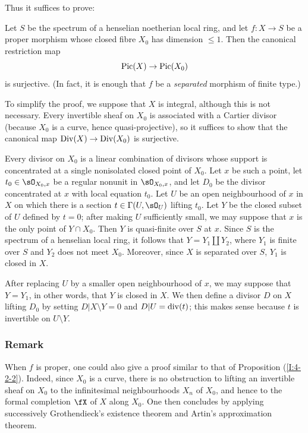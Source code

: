 Thus it suffices to prove:

\begin{proposition}\label{I:4-4-1}
Let $S$ be the spectrum of a henselian noetherian local ring, and let
$f:X\to S$ be a proper morphism whose closed fibre $X_0$ has dimension
$\leqslant1$. Then the canonical restriction map
\[
  \operatorname{Pic}(X)\to \operatorname{Pic}(X_0)
\]
is surjective. (In fact, it is enough that $f$ be a \emph{separated}
morphism of finite type.)
\end{proposition}

To simplify the proof, we suppose that $X$ is integral, although this is
not necessary. Every invertible sheaf on $X_0$ is associated with a
Cartier divisor (because $X_0$ is a curve, hence quasi-projective), so it
suffices to show that the canonical map $\operatorname{Div}(X)\to\operatorname{Div}(X_0)$ is
surjective.

Every divisor on $X_0$ is a linear combination of divisors whose support
is concentrated at a single nonisolated closed point of $X_0$. Let $x$
be such a point, let $t_0\in\sO_{X_0,x}$ be a regular nonunit in
$\sO_{X_0,x}$, and let $D_0$ be the divisor concentrated at $x$ with
local equation $t_0$. Let $U$ be an open neighbourhood of $x$ in $X$
on which there is a section $t\in\Gamma(U,\sO_U)$ lifting $t_0$. Let
$Y$ be the closed subset of $U$ defined by $t=0$; after making $U$
sufficiently small, we may suppose that $x$ is the only point of
$Y\cap X_0$. Then $Y$ is quasi-finite over $S$ at $x$. Since $S$ is
the spectrum of a henselian local ring, it follows that
$Y=Y_1\amalg Y_2$, where $Y_1$ is finite over $S$ and $Y_2$ does not
meet $X_0$. Moreover, since $X$ is separated over $S$, $Y_1$ is closed
in $X$.

After replacing $U$ by a smaller open neighbourhood of $x$, we may
suppose that $Y=Y_1$, in other words, that $Y$ is closed in $X$. We then
define a divisor $D$ on $X$ lifting $D_0$ by setting
$D|X\setminus Y=0$ and $D|U=\operatorname{div}(t)$; this makes sense because $t$ is
invertible on $U\setminus Y$.

\subsubsection{Remark}\label{I:4-4-2}

When $f$ is proper, one could also give a proof similar to that of
Proposition (\ref{I:4-2-2}). Indeed, since $X_0$ is a curve, there is no
obstruction to lifting an invertible sheaf on $X_0$ to the infinitesimal
neighbourhoods $X_n$ of $X_0$, and hence to the formal completion $\fX$
of $X$ along $X_0$. One then concludes by applying successively
Grothendieck's existence theorem and Artin's approximation theorem.

